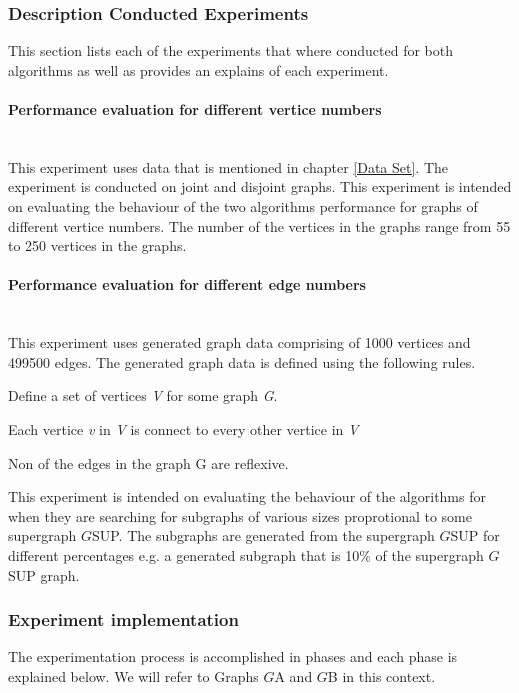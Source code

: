 \subsubsection{Description Conducted Experiments}
\label{Description Conducted Experiments}
This section lists each of the experiments that where conducted for both algorithms as well as provides an explains of each experiment.
\paragraph{Performance evaluation for different vertice numbers}\mbox{}\\
\label{Performance evaluation for different vertice numbers}
This experiment uses data that is mentioned in chapter \ref{Data Set}. The experiment is conducted on joint and disjoint graphs. This experiment is intended on evaluating the behaviour of the two algorithms performance for graphs of 
different vertice numbers. The number of the vertices in the graphs range from 55 to 250 vertices in the graphs.

\paragraph{Performance evaluation for different edge numbers}\mbox{}\\
This experiment uses generated graph data comprising of 1000 vertices and 499500 edges. The generated graph data is defined using the following rules.
\begin{myEnumerate}
  \item Define a set of vertices \textit{V} for some graph \textit{G}.
  \item Each vertice \textit{v} in \textit{V} is connect to every other vertice in \textit{V}
  \item Non of the edges in the graph G are reflexive.
\end{myEnumerate}
This experiment is intended on evaluating the behaviour of the algorithms for when they are searching for subgraphs of various sizes proprotional to some 
 supergraph $G${\tiny SUP}.\newline
The subgraphs are generated from the supergraph $G${\tiny SUP} for different percentages e.g. a generated subgraph that is 10\% of the supergraph $G${\tiny SUP} graph.

\subsubsection{Experiment implementation}
The experimentation process is accomplished in phases and each phase is explained below. We will refer to Graphs $G${\tiny A} and $G${\tiny B} in this context.

